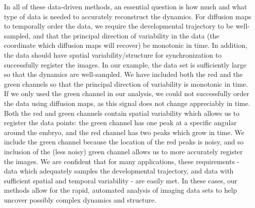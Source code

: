 \documentclass{pnastwo}
\begin{document}
\begin{article}
In all of these data-driven methods, an essential question is how much and what type of data is needed to accurately reconstruct the dynamics.
%
For diffusion maps to temporally order the data, we require the developmental trajectory to be well-sampled, and that the principal direction of variability in the data (the coordinate which diffusion maps will recover) be monotonic in time.
%
In addition, the data should have spatial variability/structure for synchronization to successfully register the images.
%
In our example, the data set is sufficiently large so that the dynamics are well-sampled.
%
We have included both the red and the green channels so that the principal direction of variability is monotonic in time.
%
If we only used the green channel in our analysis, we could not successfully order the data using diffusion maps, as this signal does not change appreciably in time.
%
Both the red and green channels contain spatial variability which allows us to register the data points: the green channel has one peak at a specific angular around the embryo, and the red channel has two peaks which grow in time.
%
We include the green channel because the location of the red peaks is noisy, and so inclusion of the (less noisy) green channel allows us to more accurately register the images.
%
%
%
%
%
%
%
We are confident that for many applications, these requirements - data which adequately samples the developmental trajectory, and data with sufficient spatial and temporal variability - are easily met.
%
In these cases, our methods allow for the rapid, automated analysis of imaging data sets to help uncover possibly complex dynamics and structure.






\end{article}
\end{document}
